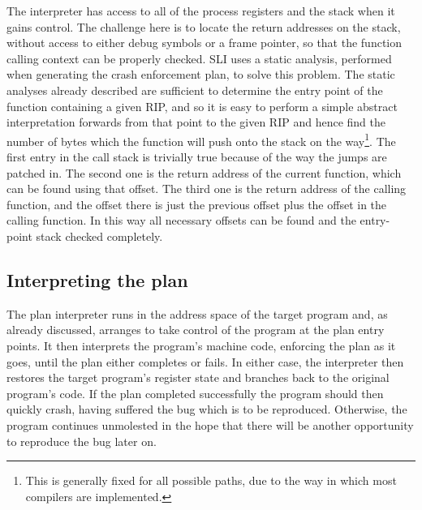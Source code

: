 The interpreter has access to all of the process registers and the
stack when it gains control.  The challenge here is to locate the
return addresses on the stack, without access to either debug symbols
or a frame pointer, so that the function calling context can be
properly checked.  SLI uses a static analysis, performed when
generating the crash enforcement plan, to solve this problem.  The
static analyses already described are sufficient to determine the
entry point of the function containing a given RIP, and so it is easy
to perform a simple abstract interpretation forwards from that point
to the given RIP and hence find the number of bytes which the function
will push onto the stack on the way\footnote{This is generally fixed
  for all possible paths, due to the way in which most compilers are
  implemented.}.  The first entry in the call stack is trivially true
because of the way the jumps are patched in.  The second one is the
return address of the current function, which can be found using that
offset.  The third one is the return address of the calling function,
and the offset there is just the previous offset plus the offset in
the calling function.  In this way all necessary offsets can be found
and the entry-point stack checked completely.


\subsection{Interpreting the plan}
\label{sect:enforce:interpreting}


The plan interpreter runs in the address space of the target program
and, as already discussed, arranges to take control of the program at
the plan entry points.  It then interprets the program's machine code,
enforcing the plan as it goes, until the plan either completes or
fails.  In either case, the interpreter then restores the target
program's register state and branches back to the original program's
code.  If the plan completed successfully the program should then
quickly crash, having suffered the bug which is to be reproduced.
Otherwise, the program continues unmolested in the hope that there
will be another opportunity to reproduce the bug later on.



